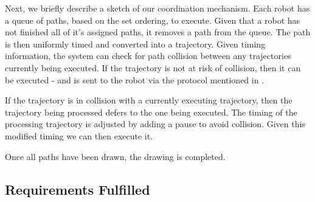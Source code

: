 Next, we briefly describe a sketch of our coordination mechanism. Each robot has a queue of paths, based on the set ordering, to execute.
Given that a robot has not finished all of it's assigned paths, it removes a path from the queue.
The path is then uniformly timed and converted into a trajectory.
Given timing information, the system can check for path collision between any trajectories currently being executed.
If the trajectory is not at risk of collision, then it can be executed - and is sent to the robot via the protocol mentioned in . 

If the trajectory is in collision with a currently executing trajectory, then the trajectory being processed defers to the one being executed. 
The timing of the processing trajectory is adjusted by adding a pause to avoid collision. Given this modified timing we can then execute it. 

Once all paths have been drawn, the drawing is completed.

\subsection{Requirements Fulfilled}